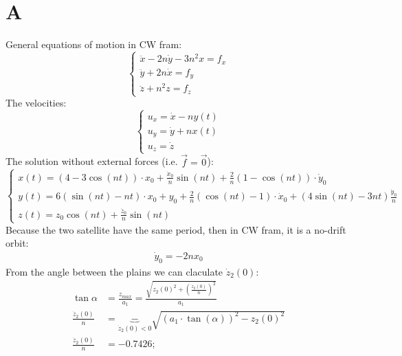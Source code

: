 \documentclass[11pt, a4paper]{article}
\begin{document}
\section{A}
General equations of motion in CW fram:
\begin{equation}
    \left\{\begin{array}{l}
        \ddot{x}-2n\dot{y}-3n^2x=f_x\\
        \ddot{y}+2n\dot{x}=f_y\\
        \ddot{z}+n^2z=f_z
    \end{array}\right.
\end{equation}
The velocities:
\begin{equation}
    \left\{\begin{array}{l}
        u_x = \dot{x}-ny(t)\\
        u_y = \dot{y}+nx(t)\\
        u_z = \dot{z}
    \end{array}\right.
\end{equation}
The solution without external forces (i.e. $\vec{f}=\vec{0}$):
\begin{equation}
    \left\{\begin{array}{l}
        \displaystyle x(t) = \left(4-3\cos(nt)\right)\cdot x_0 + \frac{\dot{x}_0}{n}\sin(nt)+\frac{2}{n}\left(1-\cos(nt)\right)\cdot\dot{y}_0 \\
        \displaystyle y(t) = 6\left(\sin(nt)-nt\right)\cdot x_0 + y_0 + \frac{2}{n}\left(\cos(nt)-1\right)\cdot\dot{x}_0 + \left(4\sin(nt)-3nt\right)\frac{\dot{y}_0}{n} \\
        \displaystyle z(t)=z_0\cos(nt)+\frac{\dot{z}_0}{n}\sin(nt)
    \end{array}\right.
\end{equation}
Because the two satellite have the same period, then in CW fram, it is a no-drift orbit:
\begin{equation}
    \begin{array}{l}
        \dot{y}_0=-2nx_0
    \end{array}
\end{equation}
From the angle between the plains we can claculate $\dot{z}_2(0)$:
\begin{align}
    \tan\alpha &= \frac{z_{max}}{a_1} = \frac{\displaystyle\sqrt{z_2(0)^2+\left(\frac{\dot{z}_2(0)}{n}\right)^2}}{a_1} \\
    \frac{\dot{z}_2(0)}{n} &= \underbrace{-}_{\displaystyle\dot{z}_2(0)<0}\sqrt{\left(a_1\cdot\tan(\alpha)\right)^2-z_2(0)^2} \\
    \frac{\dot{z}_2(0)}{n} &= -0.7426;
\end{align}
\end{document}
